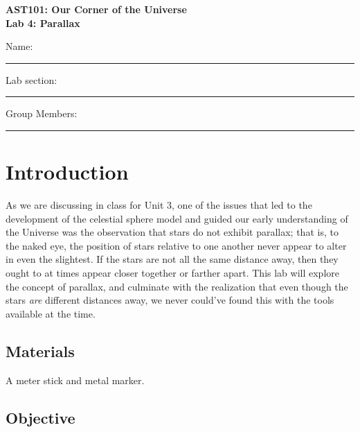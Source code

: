 \documentclass[11pt]{article}
\begin{document}
\begin{center}
\textbf{\Large
AST101: Our Corner of the Universe \\
\vspace*{0.1cm}
Lab 4: Parallax
}
\end{center}

\vspace*{0.5cm}

{\Large Name:}\vspace*{0.5cm}\\\hrule
{\Large Lab section:}\vspace*{0.5cm}\\\hrule
{\Large Group Members:}\vspace*{0.5cm}\\\hrule
\vspace*{0.5cm}

\section{Introduction}

As we are discussing in class for Unit 3, one of the issues that led to the development of the celestial sphere model and guided our early understanding of the Universe was the observation that stars do not exhibit parallax; that is, to the naked eye, the position of stars relative to one another never appear to alter in even the slightest. If the stars are not all the same distance away, then they ought to at times appear closer together or farther apart. This lab will explore the concept of parallax, and culminate with the realization that even though the stars {\it are} different distances away, we never could've found this with the tools available at the time. 

\subsection*{Materials}

A meter stick and metal marker.

\subsection*{Objective}
\end{document}
